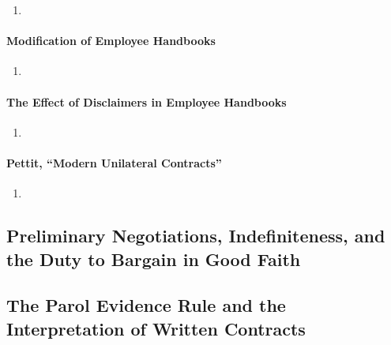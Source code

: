 \begin{enumerate}
    \item %
\end{enumerate}

\paragraph{Modification of Employee Handbooks}

\begin{enumerate}
    \item %
\end{enumerate}

\paragraph{The Effect of Disclaimers in Employee Handbooks}

\begin{enumerate}
    \item %
\end{enumerate}

\paragraph{Pettit, ``Modern Unilateral Contracts''}

\begin{enumerate}
    \item %
\end{enumerate}

\subsection{Preliminary Negotiations, Indefiniteness, and the Duty to Bargain 
in Good Faith}


\subsection{The Parol Evidence Rule and the Interpretation of Written 
Contracts}


